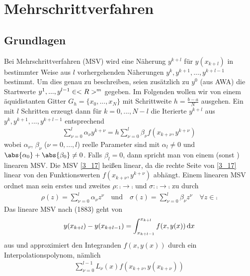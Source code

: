 \section{Mehrschrittverfahren}

\subsection{Grundlagen}

Bei Mehrschrittverfahren (MSV) wird eine Näherung $y^{k+l}$ für $y(x_{k+l})$ in bestimmter Weise aus $l$ vorhergehenden Näherungen $y^k,y^{k+1},...,y^{k+l-1}$ bestimmt. Um dies genau zu beschreiben, seien zusätzlich zu $y^0$ (aus AWA) die Startwerte $y^1,...,y^{l-1}\in<R>^m$ gegeben. Im Folgenden wollen wir von einem äquidistanten Gitter $G_h=\{x_0,...,x_N\}$ mit Schrittweite $h=\frac{b-a}{N}$ ausgehen. Ein  mit $l$ Schritten erzeugt dann für $k=0,...,N-l$ die Iterierte $y^{k+l}$ aus $y^k,y^{k+1},...,y^{k+l-1}$ entsprechend
\begin{align}
	\label{3_17}
	\sum_{\nu=0}^{l} \alpha_\nu y^{k+\nu} = h\sum_{\nu=0}^l \beta_\nu f(x_{k+\nu},y^{k+\nu})
\end{align}
wobei $\alpha_\nu$, $\beta_\nu$ ($\nu=0,...,l$) reelle Parameter sind mit $\alpha_l\neq 0$ und $\abs{\alpha_0}+\abs{\beta_0}\neq 0$. Falls $\beta_l=0$, dann spricht man von einem  (sonst ) linearen MSV. Die MSV \cref{3_17} heißen linear, da die rechte Seite von \cref{3_17} linear von den Funktionswerten $f(x_{k+\nu},y^{k+\nu})$ abhängt. Einem linearen MSV ordnet man sein erstes und zweites  $\rho:\comp\to\comp$ und $\sigma:\comp\to\comp$ zu durch
\begin{align}
	\label{3_18}
	\rho(z)=\sum_{\nu=0}^l \alpha_\nu z^\nu\quad\text{und}\quad \sigma(z)=\sum_{\nu=0}^l \beta_\nu z^\nu\quad\forall z\in\comp
\end{align}
Das lineare MSV nach  (1883) geht von
\begin{align}
	\label{3_19}
	y(x_{k+l}) - y(x_{k+l-1}) = \int_{x_{k+l-1}}^{x_{k+l}} f(x,y(x))\,\mathrm{d} x
\end{align}
aus und approximiert den Integranden $f(x,y(x))$ durch ein Interpolationspolynom, nämlich
\begin{align}
	\label{3_20}
	\sum_{\nu=0}^{l-1} L_\nu(x)f(x_{k+\nu},y(x_{k+\nu}))
\end{align}

